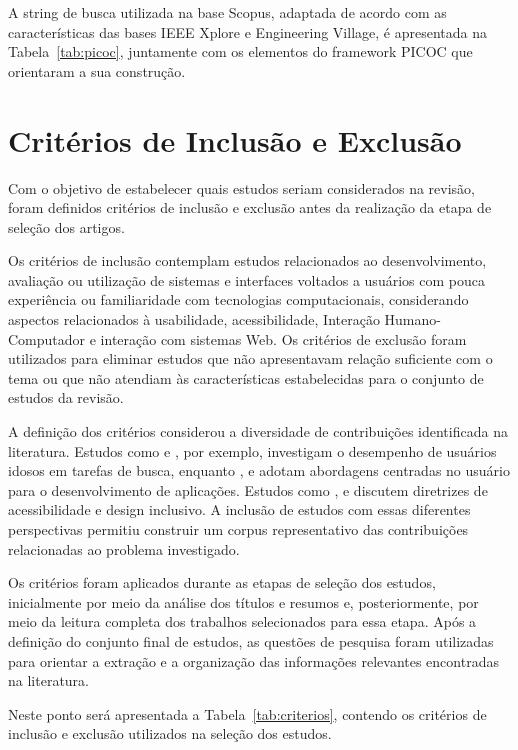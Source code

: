 A string de busca utilizada na base Scopus, adaptada de acordo com as características das bases IEEE Xplore e Engineering Village, é apresentada na Tabela~\ref{tab:picoc}, juntamente com os elementos do framework PICOC que orientaram a sua construção.


\section{Critérios de Inclusão e Exclusão}

Com o objetivo de estabelecer quais estudos seriam considerados na revisão, foram definidos critérios de inclusão e exclusão antes da realização da etapa de seleção dos artigos.

Os critérios de inclusão contemplam estudos relacionados ao desenvolvimento, avaliação ou utilização de sistemas e interfaces voltados a usuários com pouca experiência ou familiaridade com tecnologias computacionais, considerando aspectos relacionados à usabilidade, acessibilidade, Interação Humano-Computador e interação com sistemas Web. Os critérios de exclusão foram utilizados para eliminar estudos que não apresentavam relação suficiente com o tema ou que não atendiam às características estabelecidas para o conjunto de estudos da revisão.

A definição dos critérios considerou a diversidade de contribuições identificada na literatura. Estudos como \cite{sharit2008information} e \cite{allah2021empathy}, por exemplo, investigam o desempenho de usuários idosos em tarefas de busca, enquanto \cite{breaking_barriers}, \cite{balakrishnan2012user} e \cite{kymäläinen2012creating} adotam abordagens centradas no usuário para o desenvolvimento de aplicações. Estudos como \cite{wickramathilaka2023addressing}, \cite{sun2010preliminary} e \cite{dombrovskaia2021guideline} discutem diretrizes de acessibilidade e design inclusivo. A inclusão de estudos com essas diferentes perspectivas permitiu construir um corpus representativo das contribuições relacionadas ao problema investigado.

Os critérios foram aplicados durante as etapas de seleção dos estudos, inicialmente por meio da análise dos títulos e resumos e, posteriormente, por meio da leitura completa dos trabalhos selecionados para essa etapa. Após a definição do conjunto final de estudos, as questões de pesquisa foram utilizadas para orientar a extração e a organização das informações relevantes encontradas na literatura.

Neste ponto será apresentada a Tabela~\ref{tab:criterios}, contendo os critérios de inclusão e exclusão utilizados na seleção dos estudos.

